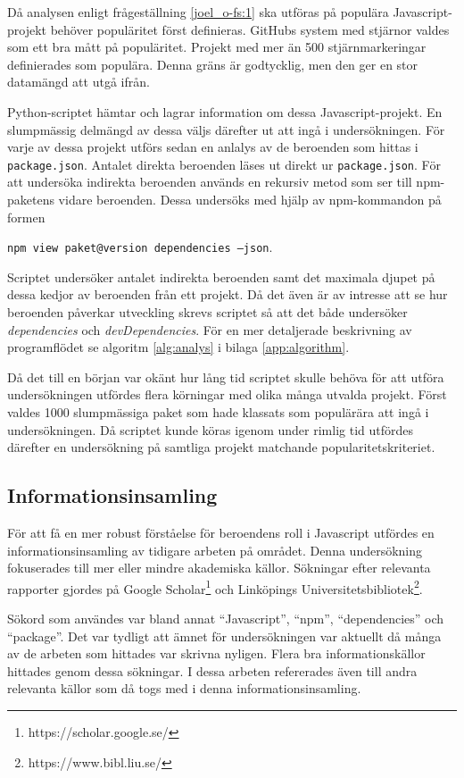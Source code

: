 Då analysen enligt frågeställning \ref{joel_o-fs:1} ska utföras på populära Javascript-projekt behöver populäritet först definieras. GitHubs system med stjärnor valdes som ett bra mått på populäritet. Projekt med mer än 500 stjärnmarkeringar definierades som populära. Denna gräns är godtycklig, men den ger en stor datamängd att utgå ifrån.

Python-scriptet hämtar och lagrar information om dessa Javascript-projekt. En slumpmässig delmängd av dessa väljs därefter ut att ingå i undersökningen. För varje av dessa projekt utförs sedan en anlalys av de beroenden som hittas i \texttt{package.json}. Antalet direkta beroenden läses ut direkt ur \texttt{package.json}. För att undersöka indirekta beroenden används en rekursiv metod som ser till npm-paketens vidare beroenden. Dessa undersöks med hjälp av npm-kommandon på formen

\begin{center}
  \texttt{npm view paket@version dependencies --json}.
\end{center}

Scriptet undersöker antalet indirekta beroenden samt det maximala djupet på dessa kedjor av beroenden från ett projekt. Då det även är av intresse att se hur beroenden påverkar utveckling skrevs scriptet så att det både undersöker \textit{dependencies} och \textit{devDependencies}. För en mer detaljerade beskrivning av programflödet se algoritm \ref{alg:analys} i bilaga \ref{app:algorithm}.

Då det till en början var okänt hur lång tid scriptet skulle behöva för att utföra undersökningen utfördes flera körningar med olika många utvalda projekt. Först valdes 1000 slumpmässiga paket som hade klassats som populärära att ingå i undersökningen. Då scriptet kunde köras igenom under rimlig tid utfördes därefter en undersökning på samtliga projekt matchande popularitetskriteriet.

\subsection{Informationsinsamling}
För att få en mer robust förståelse för beroendens roll i Javascript utfördes en informationsinsamling av tidigare arbeten på området. Denna undersökning fokuserades till mer eller mindre akademiska källor. Sökningar efter relevanta rapporter gjordes på Google Scholar\footnote{https://scholar.google.se/} och Linköpings Universitetsbibliotek\footnote{https://www.bibl.liu.se/}.

Sökord som användes var bland annat ``Javascript'', ``npm'', ``dependencies'' och ``package''. Det var tydligt att ämnet för undersökningen var aktuellt då många av de arbeten som hittades var skrivna nyligen. Flera bra informationskällor hittades genom dessa sökningar. I dessa arbeten refererades även till andra relevanta källor som då togs med i denna informationsinsamling.

